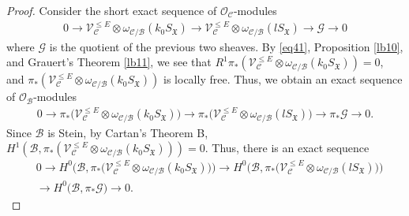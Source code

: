 \documentclass[12pt,a4paper,notitlepage]{article}
\theoremstyle{definition}
\theoremstyle{plain}
\newcommand{\fk}{\mathfrak}
\newcommand{\mc}{\mathcal}
\newcommand{\scr}{\mathscr}
\numberwithin{equation}{section}
\begin{document}
\begin{proof}
	
Consider the short exact sequence of $\scr O_{\mc C}$-modules
	\begin{align*}
	0\rightarrow \scr V_{\mc C}^{\leq E}\otimes\omega_{\mc C/\mc B}(k_0S_{\fk X})\rightarrow \scr V_{\mc C}^{\leq E}\otimes\omega_{\mc C/\mc B}(lS_{\fk X})\rightarrow\scr G\rightarrow 0
	\end{align*}
	where $\scr G$ is the quotient of the previous two sheaves. By \eqref{eq41}, Proposition \ref{lb10}, and Grauert's Theorem \ref{lb11}, we see that $R^1\pi_*(\scr V_{\mc C}^{\leq E}\otimes\omega_{\mc C/\mc B}(k_0S_{\fk X}))=0$, and $\pi_*(\scr V_{\mc C}^{\leq E}\otimes\omega_{\mc C/\mc B}(k_0S_{\fk X}))$ is locally free. Thus, we obtain an exact sequence of $\scr O_{\mc B}$-modules
	\begin{align*}
	0\rightarrow \pi_*\big(\scr V_{\mc C}^{\leq E}\otimes\omega_{\mc C/\mc B}(k_0S_{\fk X})\big)\rightarrow \pi_*\big(\scr V_{\mc C}^{\leq E}\otimes\omega_{\mc C/\mc B}(lS_{\fk X})\big)\rightarrow \pi_*\scr G\rightarrow 0.
	\end{align*}
Since $\mc B$ is Stein, by Cartan's Theorem B, $H^1(\mc B,\pi_*(\scr V_{\mc C}^{\leq E}\otimes\omega_{\mc C/\mc B}(k_0S_{\fk X})))=0$. Thus, there is an exact sequence
	\begin{align}
	&0\rightarrow H^0\big(\mc B,\pi_*\big(\scr V_{\mc C}^{\leq E}\otimes\omega_{\mc C/\mc B}(k_0S_{\fk X})\big)\big)\rightarrow H^0\big(\mc B,\pi_*\big(\scr V_{\mc C}^{\leq E}\otimes\omega_{\mc C/\mc B}(lS_{\fk X})\big)\big)\nonumber\\
	&\rightarrow H^0\big(\mc B,\pi_*\scr G\big)\rightarrow 0. \label{eq43}
	\end{align}
	

\end{proof}
\end{document}
